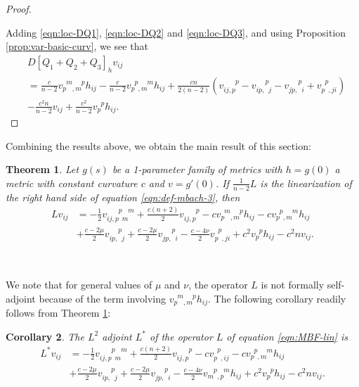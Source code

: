 \documentclass[10pt,reqno]{amsart}
\newtheorem{theorem}{Theorem}[section]
\newtheorem{cor}[theorem]{Corollary}
\newcommand{\vdu}[2]{v_{#1}^{\phantom{#1} #2}}
\newcommand{\vdddu}[4]{v_{#1 #2, #3}^{\phantom{#1#2,#3} #4}}
\newcommand{\vddud}[4]{v_{#1 #2, \phantom{#3} #4}^{\phantom{#1#2,} #3 \phantom{#4}}}
\newcommand{\vdudd}[4]{v_{#1 \phantom{#2}, #3 #4}^{\phantom{#1} #2 \phantom{, #3 #4}}}
\newcommand{\vdudu}[4]{v_{#1 \phantom{#2}, #3 \phantom{#4}}^{\phantom{#1} #2 \phantom{, #3} #4}}
\newcommand{\vdddudu}[6]{v_{#1#2,#3\phantom{#4}#5\phantom{#6}}^{\phantom{#1#2,#3}#4\phantom{#5}#6}}
\begin{document}
\begin{proof}
\

Adding \eqref{eqn:loc-DQ1}, \eqref{eqn:loc-DQ2} and \eqref{eqn:loc-DQ3}, and using Proposition \ref{prop:var-basic-curv}, we see that
\begin{align*}
&D[Q_1+Q_2+Q_3]_h v_{ij} \nonumber
\\&= \frac{c}{n-2} \vdudu{p}{m}{m}{p} h_{ij} - \frac{c}{n-2} \vdudu{p}{p}{m}{m} h_{ij} + \frac{cn}{2(n-2)} (\vdddu{i}{j}{p}{p} - \vddud{i}{p}{p}{j} - \vddud{j}{p}{p}{i} + \vdudd{p}{p}{j}{i})\\
& - \frac{c^2 n}{n-2} v_{ij} + \frac{c^2}{n-2} \vdu{p}{p} h_{ij}. \nonumber
\end{align*}
\end{proof}



Combining the results above, we obtain the main result of this section: 
\begin{theorem}
\label{thm:Lin}
Let $g(s)$ be a 1-parameter family of metrics with $h = g(0)$ a metric  with constant curvature $c$ and $v = g'(0)$. If $\frac{1}{n-2}L$ is the linearization of the 
right hand side of equation \eqref{eqn:def-mbach-3}, then 
\begin{align} \label{eqn:MBF-lin}
L v_{ij} &= -\frac{1}{2} \vdddudu{i}{j}{p}{p}{m}{m} + \frac{c(n+2)}{2} \vdddu{i}{j}{p}{p} - c \vdudu{p}{m}{m}{p} h_{ij} -c \vdudu{p}{p}{m}{m} h_{ij} \nonumber \\
&+ \frac{c - 2 \mu}{2} \vddud{i}{p}{p}{j} + \frac{c -2 \mu}{2} \vddud{j}{p}{p}{i} - \frac{c - 4\nu}{2} \vdudd{p}{p}{j}{i} + c^2 \vdu{p}{p} h_{ij} - c^2 n v_{ij}.
\end{align}
\end{theorem}

\

We note that for general values of $\mu$ and $\nu$, the operator $L$ is not formally self-adjoint because of the term involving $\vdudu{p}{m}{m}{p} h_{ij}$. The following corollary readily follows from Theorem \ref{thm:Lin}:
\begin{cor} 
The $L^2$ adjoint $L^*$ of the operator $L$ of equation  \eqref{eqn:MBF-lin} is 
\begin{align*}
L^*v_{ij} &= -\frac{1}{2} \vdddudu{i}{j}{p}{p}{m}{m} + \frac{c(n+2)}{2} \vdddu{i}{j}{p}{p} - c \vdudd{p}{p}{i}{j}  -c \vdudu{p}{p}{m}{m} h_{ij} \nonumber \\ 
&+ \frac{c -2 \mu}{2} \vddud{i}{p}{p}{j} + \frac{c -2\mu}{2} \vddud{j}{p}{p}{i} - \frac{c - 4\nu}{2} \vdudu{m}{p}{p}{m} h_{ij} + c^2 \vdu{p}{p} h_{ij} - c^2 n v_{ij}.
\end{align*}
\end{cor}
\end{document}
